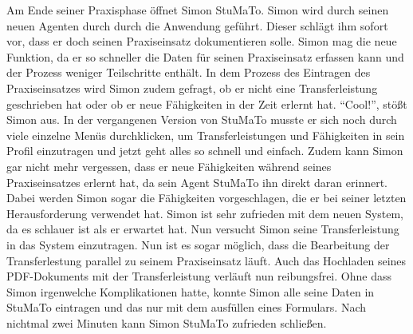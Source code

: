 \documentclass[
  12pt,
  ngerman,
  a4paper,
]{article}
\begin{document}
Am Ende seiner Praxisphase öffnet Simon StuMaTo. Simon wird durch seinen
neuen Agenten durch durch die Anwendung geführt. Dieser schlägt ihm
sofort vor, dass er doch seinen Praxiseinsatz dokumentieren solle. Simon
mag die neue Funktion, da er so schneller die Daten für seinen
Praxiseinsatz erfassen kann und der Prozess weniger Teilschritte
enthält. In dem Prozess des Eintragen des Praxiseinsatzes wird Simon
zudem gefragt, ob er nicht eine Transferleistung geschrieben hat oder ob
er neue Fähigkeiten in der Zeit erlernt hat. ``Cool!'', stößt Simon aus.
In der vergangenen Version von StuMaTo musste er sich noch durch viele
einzelne Menüs durchklicken, um Transferleistungen und Fähigkeiten in
sein Profil einzutragen und jetzt geht alles so schnell und einfach.
Zudem kann Simon gar nicht mehr vergessen, dass er neue Fähigkeiten
während seines Praxiseinsatzes erlernt hat, da sein Agent StuMaTo ihn
direkt daran erinnert. Dabei werden Simon sogar die Fähigkeiten
vorgeschlagen, die er bei seiner letzten Herausforderung verwendet hat.
Simon ist sehr zufrieden mit dem neuen System, da es schlauer ist als er
erwartet hat. Nun versucht Simon seine Transferleistung in das System
einzutragen. Nun ist es sogar möglich, dass die Bearbeitung der
Transferlestung parallel zu seinem Praxiseinsatz läuft. Auch das
Hochladen seines PDF-Dokuments mit der Transferleistung verläuft nun
reibungsfrei. Ohne dass Simon irgenwelche Komplikationen hatte, konnte
Simon alle seine Daten in StuMaTo eintragen und das nur mit dem
ausfüllen eines Formulars. Nach nichtmal zwei Minuten kann Simon StuMaTo
zufrieden schließen.
\end{document}
